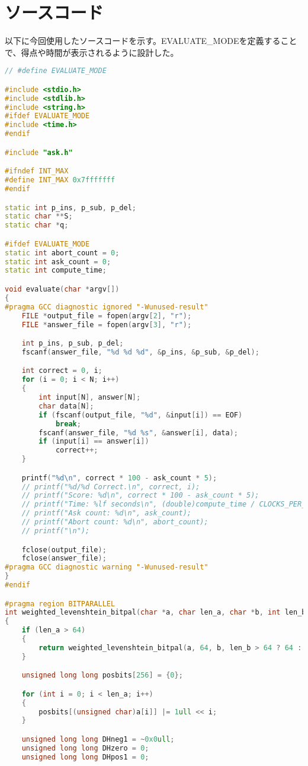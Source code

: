 \documentclass[dvipdfmx]{jsarticle}
\begin{document}
\section{ソースコード}
以下に今回使用したソースコードを示す。EVALUATE_MODEを定義することで、得点や時間が表示されるように設計した。

\begin{lstlisting}[language=C++]
// #define EVALUATE_MODE

#include <stdio.h>
#include <stdlib.h>
#include <string.h>
#ifdef EVALUATE_MODE
#include <time.h>
#endif

#include "ask.h"

#ifndef INT_MAX
#define INT_MAX 0x7fffffff
#endif

static int p_ins, p_sub, p_del;
static char **S;
static char *q;

#ifdef EVALUATE_MODE
static int abort_count = 0;
static int ask_count = 0;
static int compute_time;

void evaluate(char *argv[])
{
#pragma GCC diagnostic ignored "-Wunused-result"
	FILE *output_file = fopen(argv[2], "r");
	FILE *answer_file = fopen(argv[3], "r");

	int p_ins, p_sub, p_del;
	fscanf(answer_file, "%d %d %d", &p_ins, &p_sub, &p_del);

	int correct = 0, i;
	for (i = 0; i < N; i++)
	{
		int input[N], answer[N];
		char data[N];
		if (fscanf(output_file, "%d", &input[i]) == EOF)
			break;
		fscanf(answer_file, "%d %s", &answer[i], data);
		if (input[i] == answer[i])
			correct++;
	}

	printf("%d\n", correct * 100 - ask_count * 5);
	// printf("%d/%d Correct.\n", correct, i);
	// printf("Score: %d\n", correct * 100 - ask_count * 5);
	// printf("Time: %lf seconds\n", (double)compute_time / CLOCKS_PER_SEC);
	// printf("Ask count: %d\n", ask_count);
	// printf("Abort count: %d\n", abort_count);
	// printf("\n");

	fclose(output_file);
	fclose(answer_file);
#pragma GCC diagnostic warning "-Wunused-result"
}
#endif

#pragma region BITPARALLEL
int weighted_levenshtein_bitpal(char *a, char len_a, char *b, int len_b)
{
	if (len_a > 64)
	{
		return weighted_levenshtein_bitpal(a, 64, b, len_b > 64 ? 64 : len_b);
	}

	unsigned long long posbits[256] = {0};

	for (int i = 0; i < len_a; i++)
	{
		posbits[(unsigned char)a[i]] |= 1ull << i;
	}

	unsigned long long DHneg1 = ~0x0ull;
	unsigned long long DHzero = 0;
	unsigned long long DHpos1 = 0;


\end{lstlisting}
\end{document}
